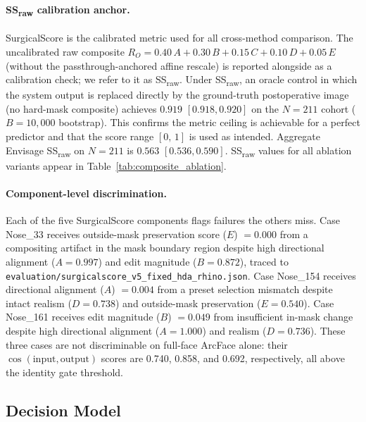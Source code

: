 \documentclass{article}
\newcommand{\method}{Envisage}
\begin{document}
\paragraph{SS\textsubscript{raw} calibration anchor.}
SurgicalScore is the calibrated metric used for all cross-method comparison.
The uncalibrated raw composite $R_O = 0.40\,A + 0.30\,B + 0.15\,C + 0.10\,D + 0.05\,E$
(without the passthrough-anchored affine rescale) is reported alongside as a calibration
check; we refer to it as SS\textsubscript{raw}.
Under SS\textsubscript{raw}, an oracle control in which the system output is replaced
directly by the ground-truth postoperative image (no hard-mask composite) achieves
$0.919$ $[0.918, 0.920]$ on the $N{=}211$ cohort ($B{=}10{,}000$ bootstrap).
This confirms the metric ceiling is achievable for a perfect predictor and that the
score range $[0,\,1]$ is used as intended.
Aggregate \method{} SS\textsubscript{raw} on $N{=}211$ is $0.563$ $[0.536, 0.590]$.
SS\textsubscript{raw} values for all ablation variants appear in
Table~\ref{tab:composite_ablation}.

\paragraph{Component-level discrimination.}
Each of the five SurgicalScore components flags failures the others miss.
Case Nose\_33 receives outside-mask preservation score ($E$) $= 0.000$ from a
compositing artifact in the mask boundary region despite high directional alignment
($A = 0.997$) and edit magnitude ($B = 0.872$), traced to
\texttt{evaluation/surgicalscore\_v5\_fixed\_hda\_rhino.json}.
Case Nose\_154 receives directional alignment ($A$) $= 0.004$ from a preset selection
mismatch despite intact realism ($D = 0.738$) and outside-mask preservation
($E = 0.540$).
Case Nose\_161 receives edit magnitude ($B$) $= 0.049$ from insufficient in-mask change
despite high directional alignment ($A = 1.000$) and realism ($D = 0.736$).
These three cases are not discriminable on full-face ArcFace alone: their
$\cos(\text{input}, \text{output})$ scores are 0.740, 0.858, and 0.692,
respectively, all above the identity gate threshold.

\subsection{Decision Model}
\label{sec:decision_model}
\end{document}
